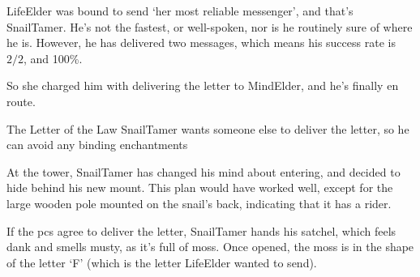 \Gls{LifeElder} was bound to send `her most reliable messenger', and that's \gls{SnailTamer}.
He's not the fastest, or well-spoken, nor is he routinely sure of where he is.
However, he has delivered two messages, which means his success rate is $2/2$, and 100\%.

So she charged him with delivering the letter to \gls{MindElder}, and he's finally en route.

{The Letter of the Law}%
{\gls{SnailTamer} wants someone else to deliver the letter, so he can avoid any binding enchantments}%

At the tower, \gls{SnailTamer} has changed his mind about entering, and decided to hide behind his new mount.
This plan would have worked well, except for the large wooden pole mounted on the snail's back, indicating that it has a rider.

If the \glspl{pc} agree to deliver the letter,
\gls{SnailTamer} hands his satchel, which feels dank and smells musty, as it's full of moss.
Once opened, the moss is in the shape of the letter `F' (which is the letter \gls{LifeElder} wanted to send).

